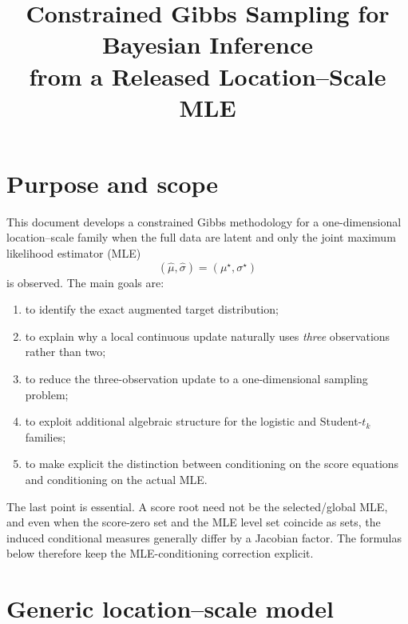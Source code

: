 \documentclass[11pt]{article}
\title{Constrained Gibbs Sampling for Bayesian Inference\\from a Released Location--Scale MLE}
\author{}
\date{}
\newcommand{\1}{\mathbf{1}}
\begin{document}
\maketitle

\section{Purpose and scope}

This document develops a constrained Gibbs methodology for a one-dimensional location--scale family when the full data are latent and only the joint maximum likelihood estimator (MLE)
\[
    (\widehat\mu,\widehat\sigma)=(\mu^\star,\sigma^\star)
\]
is observed.  The main goals are:
\begin{enumerate}[label=(\roman*)]
    \item to identify the exact augmented target distribution;
    \item to explain why a local continuous update naturally uses \emph{three} observations rather than two;
    \item to reduce the three-observation update to a one-dimensional sampling problem;
    \item to exploit additional algebraic structure for the logistic and Student-$t_k$ families;
    \item to make explicit the distinction between conditioning on the score equations and conditioning on the actual MLE.
\end{enumerate}

The last point is essential.  A score root need not be the selected/global MLE, and even when the score-zero set and the MLE level set coincide as sets, the induced conditional measures generally differ by a Jacobian factor.  The formulas below therefore keep the MLE-conditioning correction explicit.

\section{Generic location--scale model}
\end{document}

